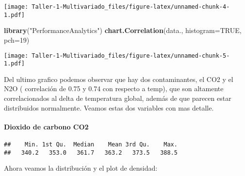 \documentclass[]{article}
\newenvironment{Shaded}{\begin{snugshade}}{\end{snugshade}}
\newcommand{\KeywordTok}[1]{\textcolor[rgb]{0.13,0.29,0.53}{\textbf{#1}}}
\newcommand{\DataTypeTok}[1]{\textcolor[rgb]{0.13,0.29,0.53}{#1}}
\newcommand{\DecValTok}[1]{\textcolor[rgb]{0.00,0.00,0.81}{#1}}
\newcommand{\StringTok}[1]{\textcolor[rgb]{0.31,0.60,0.02}{#1}}
\newcommand{\OtherTok}[1]{\textcolor[rgb]{0.56,0.35,0.01}{#1}}
\newcommand{\OperatorTok}[1]{\textcolor[rgb]{0.81,0.36,0.00}{\textbf{#1}}}
\newcommand{\NormalTok}[1]{#1}
\let\oldparagraph\paragraph
\renewcommand{\paragraph}[1]{\oldparagraph{#1}\mbox{}}
\begin{document}
\texttt{[image: Taller-1-Multivariado\_files/figure-latex/unnamed-chunk-4-1.pdf]}

\begin{Shaded}
\begin{Highlighting}[]
\KeywordTok{library}\NormalTok{(}\StringTok{"PerformanceAnalytics"}\NormalTok{)}
\KeywordTok{chart.Correlation}\NormalTok{(data., }\DataTypeTok{histogram=}\OtherTok{TRUE}\NormalTok{, }\DataTypeTok{pch=}\DecValTok{19}\NormalTok{)}
\end{Highlighting}
\end{Shaded}

\texttt{[image: Taller-1-Multivariado\_files/figure-latex/unnamed-chunk-5-1.pdf]}

Del ultimo grafico podemos observar que hay dos contaminantes, el CO2 y
el N2O ( correlación de 0.75 y 0.74 con respecto a temp), que son
altamente correlacionados al delta de temperatura global, además de que
parecen estar distribuidos normalmente. Veamos estas dos variables con
mas detalle.

\paragraph{\texorpdfstring{\textbf{Dioxido de carbono
CO2}}{Dioxido de carbono CO2}}\label{dioxido-de-carbono-co2}

\begin{Shaded}
\end{Shaded}

\begin{verbatim}
##    Min. 1st Qu.  Median    Mean 3rd Qu.    Max. 
##   340.2   353.0   361.7   363.2   373.5   388.5
\end{verbatim}

Ahora veamos la distribución y el plot de densidad:
\end{document}
